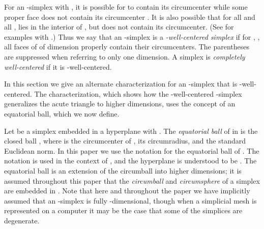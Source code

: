 \documentclass[final]{siamltex}
\begin{document}
For an -simplex  with , it is possible for
 to contain its circumcenter  while some
proper face  does not contain its
circumcenter .  It is also possible that for all  and all ,  lies in
the interior of , but  does not contain its
circumcenter.  (See \cite{VaHiGu2008} for examples with .)
Thus we say that an -simplex  is a
{\emph{-well-centered simplex}} if for , , all faces of  of dimension 
properly contain their circumcenters.  The parentheses are suppressed
when referring to only one dimension.  A simplex  is
{\emph{completely well-centered}} if it is
-well-centered.




In this section we give an alternate characterization for an
-simplex  that is -well-centered.
The characterization, which shows how the -well-centered
-simplex generalizes the acute triangle to higher dimensions,
uses the concept of an equatorial ball,
which we now define.

Let  be a simplex embedded in a
hyperplane  with .  The {\emph{equatorial ball}} of
 in  is the closed ball , where  is the
circumcenter of ,  its circumradius, and
 the standard Euclidean norm.  In this paper we
use the notation  for the equatorial ball of
.  The notation is used in the context of , and the hyperplane 
is understood to be .
The equatorial ball is an extension of the circumball into higher
dimensions; it is assumed throughout this paper that the
{\emph{circumball}} and {\emph{circumsphere}} of a simplex
 are embedded in .  Note that here and
throughout the paper we have implicitly assumed that an -simplex is
fully -dimensional, though when a simplicial mesh is represented on
a computer it may be the case that some of the simplices are
degenerate.

\bigskip
\end{document}
